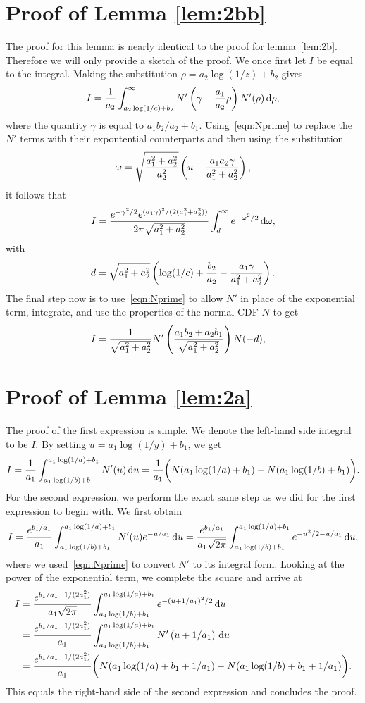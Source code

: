 \section{Proof of Lemma \ref{lem:2bb}}
The proof for this lemma is nearly identical to the proof for lemma~\ref{lem:2b}. Therefore we will only provide a sketch of the proof. We once first let $I$ be equal to the integral. Making the substitution $\rho = a_2\log(1/z) + b_2$ gives
	\begin{equation*}
		I =  \frac{1}{a_2}\int_{a_2\log(1/c)+b_2}^\infty N'\left(\gamma - \frac{a_1}{a_2}\rho \right)N'(\rho) \, \mathrm d \rho,
	\end{equation*}	
where the quantity $\gamma$ is equal to $a_1b_2/a_2 + b_1$. Using~\eqref{eqn:Nprime} to replace the $N'$ terms with their expontential counterparts and then using the substitution
	$$
		\omega = \sqrt{\frac{a_1^2+a_2^2}{a_2^2}}\left( u - \frac{a_1a_2\gamma}{a_1^2+a_2^2} \right),
	$$
it follows that
	$$
		I = \frac{e^{-\gamma^2/2}e^{(a_1\gamma)^2/(2(a_1^2+a_2^2))}}{2\pi \sqrt{a_1^2+a_2^2}}\int_d^\infty e^{-\omega^2/2} \, \mathrm d\omega,
	$$
with
	$$
		d =  \sqrt{a_1^2+a_2^2}\left( \log(1/c) + \frac{b_2}{a_2} - \frac{a_1\gamma}{a_1^2+a_2^2} \right).
	$$
The final step now is to use~\eqref{eqn:Nprime} to allow $N'$ in place of the exponential term, integrate, and use the properties of the normal CDF $N$ to get
	\begin{align*}
		I  &=\frac{1}{\sqrt{a_1^2 + a_2^2}}N'\left( \frac{a_1b_2 + a_2b_1}{\sqrt{a_1^2+a_2^2}} \right)N(-d),
	\end{align*}

\section{Proof of Lemma \ref{lem:2a}}
The proof of the first expression is simple. We denote the left-hand side integral to be $I$. By setting $u = a_1\log(1/y) + b_1$, we get
	$$
		I = \frac{1}{a_1}\int_{a_1\log(1/b)+b_1}^{a_1\log(1/a)+b_1} N'(u) \, \mathrm d u = \frac{1}{a_1}\bigg( N(a_1\log(1/a)+b_1) - N(a_1\log(1/b)+b_1) \bigg).
	$$
For the second expression, we perform the exact same step as we did for the first expression to begin with. We first obtain
	$$
		I = \frac{e^{b_1/a_1}}{a_1}\int_{a_1\log(1/b)+b_1}^{a_1\log(1/a)+b_1} N'(u)e^{-u/a_1} \, \mathrm d u = \frac{e^{b_1/a_1}}{a_1\sqrt{2\pi}}\int_{a_1\log(1/b)+b_1}^{a_1\log(1/a)+b_1} e^{-u^2/2-u/a_1} \, \mathrm d u,
	$$
where we used~\eqref{eqn:Nprime} to convert $N'$ to its integral form. Looking at the power of the exponential term, we complete the square and arrive at
	\begin{align*}
		I &= \frac{e^{b_1/a_1+1/(2a_1^2)}}{a_1\sqrt{2\pi}}\int_{a_1\log(1/b)+b_1}^{a_1\log(1/a)+b_1}e^{-(u+1/a_1)^2/2} \, \mathrm d u \\
		&= \frac{e^{b_1/a_1+1/(2a_1^2)}}{a_1}\int_{a_1\log(1/b)+b_1}^{a_1\log(1/a)+b_1}N'\left( u + 1/a_1 \right) \, \mathrm d u \\
		&= \frac{e^{b_1/a_1 + 1/(2a_1^2)}}{a_1}\bigg( N(a_1\log(1/a)+b_1 + 1/a_1) - N(a_1\log(1/b) +b_1 + 1/a_1) \bigg).
	\end{align*}
This equals the right-hand side of the second expression and concludes the proof.
